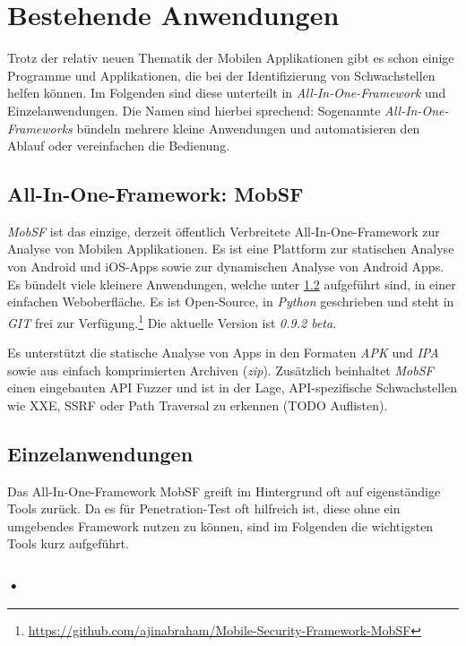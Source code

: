 \section{Bestehende Anwendungen}
Trotz der relativ neuen Thematik der Mobilen Applikationen gibt es schon einige Programme und Applikationen, die bei der Identifizierung von Schwachstellen helfen können. Im Folgenden sind diese unterteilt in \textit{All-In-One-Framework} und Einzelanwendungen. Die Namen sind hierbei sprechend: Sogenannte \textit{All-In-One-Frameworks} bündeln mehrere kleine Anwendungen und automatisieren den Ablauf oder vereinfachen die Bedienung.

\subsection{All-In-One-Framework: MobSF}
\textit{MobSF} ist das einzige, derzeit öffentlich Verbreitete All-In-One-Framework zur Analyse von Mobilen Applikationen. Es ist eine Plattform zur statischen Analyse von Android und iOS-Apps sowie zur dynamischen Analyse von Android Apps. Es bündelt viele kleinere Anwendungen, welche unter \ref{Pen:Eingelanwendungen} aufgeführt sind, in einer einfachen Weboberfläche. Es ist Open-Source, in \textit{Python} geschrieben und steht in \textit{GIT} frei zur Verfügung.\footnote{\url{https://github.com/ajinabraham/Mobile-Security-Framework-MobSF}} Die aktuelle Version ist \textit{0.9.2 beta}.

Es unterstützt die statische Analyse von Apps in den Formaten \textit{APK} und \textit{IPA} sowie aus einfach komprimierten Archiven (\textit{zip}). Zusätzlich beinhaltet \textit{MobSF} einen eingebauten API Fuzzer und ist in der Lage, API-spezifische Schwachstellen wie XXE, SSRF oder Path Traversal zu erkennen (TODO Auflisten).

\subsection{Einzelanwendungen}\label{Pen:Eingelanwendungen}
Das All-In-One-Framework MobSF greift im Hintergrund oft auf eigenständige Tools zurück. Da es für Penetration-Test oft hilfreich ist, diese ohne ein umgebendes Framework nutzen zu können, sind im Folgenden die wichtigsten Tools kurz aufgeführt.

\subsubsection{•}